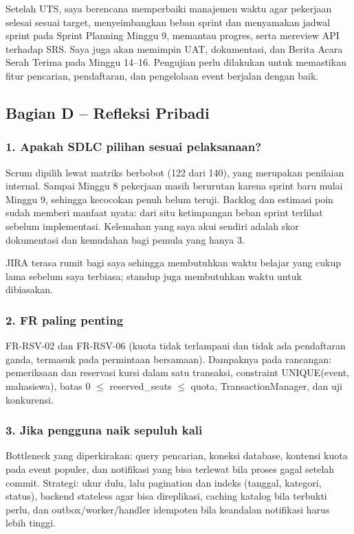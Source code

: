\documentclass[11pt,a4paper]{article}
\begin{document}
Setelah UTS, saya berencana memperbaiki manajemen waktu agar pekerjaan selesai sesuai target, menyeimbangkan beban sprint dan menyamakan jadwal sprint pada Sprint Planning Minggu 9, memantau progres, serta mereview API terhadap SRS. Saya juga akan memimpin UAT, dokumentasi, dan Berita Acara Serah Terima pada Minggu 14--16. Pengujian perlu dilakukan untuk memastikan fitur pencarian, pendaftaran, dan pengelolaan event berjalan dengan baik.

\subsection*{Bagian D -- Refleksi Pribadi}

\subsubsection*{1. Apakah SDLC pilihan sesuai pelaksanaan?}

Scrum dipilih lewat matriks berbobot (122 dari 140), yang merupakan penilaian internal. Sampai Minggu 8 pekerjaan masih berurutan karena sprint baru mulai Minggu 9, sehingga kecocokan penuh belum teruji. Backlog dan estimasi poin sudah memberi manfaat nyata: dari situ ketimpangan beban sprint terlihat sebelum implementasi. Kelemahan yang saya akui sendiri adalah skor dokumentasi dan kemudahan bagi pemula yang hanya 3.

JIRA terasa rumit bagi saya sehingga membutuhkan waktu belajar yang cukup lama sebelum saya terbiasa; standup juga membutuhkan waktu untuk dibiasakan.

\subsubsection*{2. FR paling penting}

FR-RSV-02 dan FR-RSV-06 (kuota tidak terlampaui dan tidak ada pendaftaran ganda, termasuk pada permintaan bersamaan). Dampaknya pada rancangan: pemeriksaan dan reservasi kursi dalam satu transaksi, constraint UNIQUE(event, mahasiswa), batas 0 $\leq$ reserved\_seats $\leq$ quota, TransactionManager, dan uji konkurensi.

\subsubsection*{3. Jika pengguna naik sepuluh kali}

Bottleneck yang diperkirakan: query pencarian, koneksi database, kontensi kuota pada event populer, dan notifikasi yang bisa terlewat bila proses gagal setelah commit. Strategi: ukur dulu, lalu pagination dan indeks (tanggal, kategori, status), backend stateless agar bisa direplikasi, caching katalog bila terbukti perlu, dan outbox/worker/handler idempoten bila keandalan notifikasi harus lebih tinggi.
\end{document}
